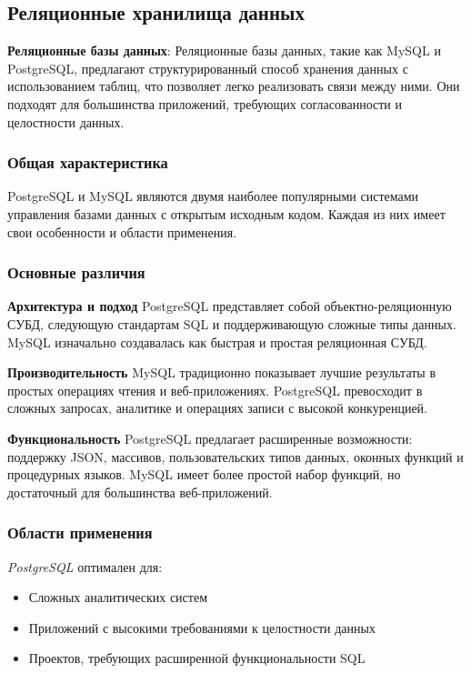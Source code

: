 \subsection{Реляционные хранилища данных}
\textbf{Реляционные базы данных}: Реляционные базы данных, такие как MySQL и PostgreSQL, предлагают структурированный способ хранения данных с использованием таблиц, что позволяет легко реализовать связи между ними\cite{fowler2002patterns}. Они подходят для большинства приложений, требующих согласованности и целостности данных.

\subsubsection*{Общая характеристика}

PostgreSQL и MySQL являются двумя наиболее популярными системами управления базами данных с открытым исходным кодом\cite{ziger2017postgresql}. Каждая из них имеет свои особенности и области применения.

\subsubsection*{Основные различия}

\textbf{Архитектура и подход}
PostgreSQL представляет собой объектно-реляционную СУБД, следующую стандартам SQL и поддерживающую сложные типы данных. MySQL изначально создавалась как быстрая и простая реляционная СУБД.

\textbf{Производительность}
MySQL традиционно показывает лучшие результаты в простых операциях чтения и веб-приложениях. PostgreSQL превосходит в сложных запросах, аналитике и операциях записи с высокой конкуренцией.

\textbf{Функциональность}
PostgreSQL предлагает расширенные возможности: поддержку JSON, массивов, пользовательских типов данных, оконных функций и процедурных языков. MySQL имеет более простой набор функций, но достаточный для большинства веб-приложений.

\subsubsection*{Области применения}

\textit{PostgreSQL} оптимален для:
\begin{itemize}
\item Сложных аналитических систем
\item Приложений с высокими требованиями к целостности данных
\item Проектов, требующих расширенной функциональности SQL
\end{itemize}

